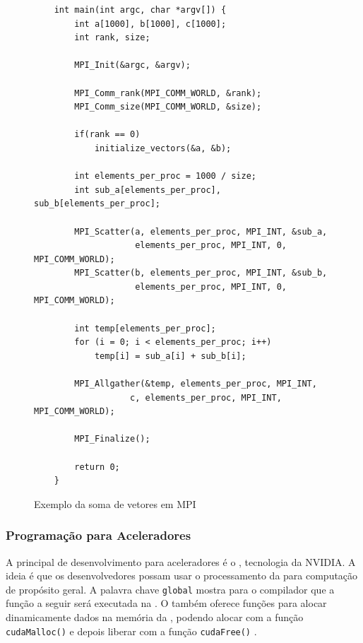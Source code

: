 \begin{figure}[t]
    \centering
    \begin{lstlisting}
    int main(int argc, char *argv[]) {
        int a[1000], b[1000], c[1000];
        int rank, size;
        
        MPI_Init(&argc, &argv);
        
        MPI_Comm_rank(MPI_COMM_WORLD, &rank);
        MPI_Comm_size(MPI_COMM_WORLD, &size);
        
        if(rank == 0)
            initialize_vectors(&a, &b);
        
        int elements_per_proc = 1000 / size;
        int sub_a[elements_per_proc], sub_b[elements_per_proc];
    
        MPI_Scatter(a, elements_per_proc, MPI_INT, &sub_a,
                    elements_per_proc, MPI_INT, 0, MPI_COMM_WORLD);
        MPI_Scatter(b, elements_per_proc, MPI_INT, &sub_b,
                    elements_per_proc, MPI_INT, 0, MPI_COMM_WORLD);
    
        int temp[elements_per_proc];
        for (i = 0; i < elements_per_proc; i++)
            temp[i] = sub_a[i] + sub_b[i];
        
        MPI_Allgather(&temp, elements_per_proc, MPI_INT,
                   c, elements_per_proc, MPI_INT, MPI_COMM_WORLD);
        
        MPI_Finalize();
        
        return 0;
    }
    \end{lstlisting}
    \caption{Exemplo da soma de vetores em MPI}
    \label{fig:lstmpi}
\end{figure}

\subsubsection{Programação para Aceleradores}

A principal \api de desenvolvimento para aceleradores é o \cuda, tecnologia da NVIDIA. A ideia é que os desenvolvedores possam usar o processamento da \gpu para computação de propósito geral. A palavra chave \texttt{global} mostra para o compilador que a função a seguir será executada na \gpu. O \cuda também oferece funções para alocar dinamicamente dados na memória da \gpu, podendo alocar com a função \texttt{cudaMalloc()} e depois liberar com a função \texttt{cudaFree()} \cite{Sanders2010}.

